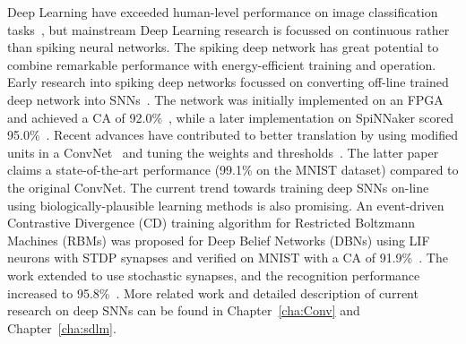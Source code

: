 Deep Learning have exceeded human-level performance on image classification tasks~\citep{he2015delving}, but mainstream Deep Learning research is focussed on continuous rather than spiking neural networks.
The spiking deep network has great potential to combine remarkable performance with energy-efficient training and operation.
Early research into spiking deep networks focussed on converting off-line trained deep network into SNNs~\citep{o2013real}.
The network was initially implemented on an FPGA and achieved a CA of 92.0\%~\citep{neil2014minitaur}, while a later implementation on SpiNNaker scored 95.0\%~\citep{Stromatias2015scalable}.
Recent advances have contributed to better translation by using modified units in a ConvNet~\citep{cao2015spiking} and tuning the weights and thresholds~\citep{diehl2015fast}.
The latter paper claims a state-of-the-art performance (99.1\% on the MNIST dataset) compared to the original ConvNet.
The current trend towards training deep SNNs on-line using biologically-plausible learning methods is also promising.
An event-driven Contrastive Divergence (CD) training algorithm for Restricted Boltzmann Machines (RBMs) was proposed for Deep Belief Networks (DBNs) using LIF neurons with STDP synapses and verified on MNIST with a CA of 91.9\%~\citep{neftci2013event}.
The work extended to use stochastic synapses, and the recognition performance increased to 95.8\%~\citep{neftci2016stochastic}.
More related work and detailed description of current research on deep SNNs can be found in Chapter~\ref{cha:Conv} and Chapter~\ref{cha:sdlm}.


